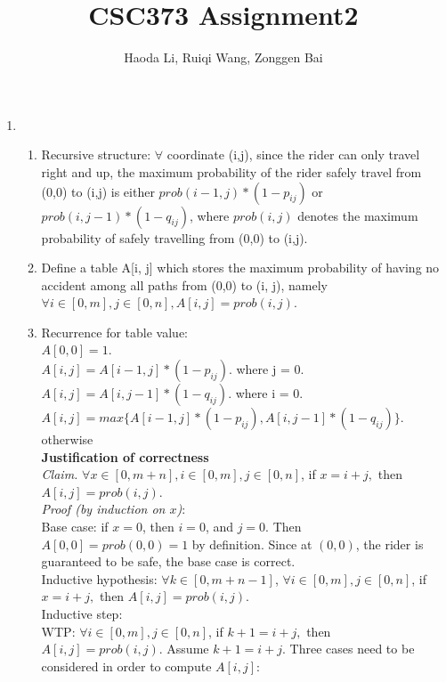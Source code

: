 \documentclass[11pt]{article}
\title{CSC373 Assignment2}
\author{Haoda Li, Ruiqi Wang, Zonggen Bai}
\begin{document}
\maketitle
\begin{enumerate}
    \item
    \begin{enumerate}
        \item Recursive structure: $\forall$ coordinate (i,j), since the rider can only travel right and up, the maximum probability of the rider safely travel from (0,0) to (i,j) is either $prob(i-1,j) * (1-p_{ij})$ or $prob(i,j-1) * (1-q_{ij})$, where $prob(i,j)$ denotes the maximum probability of safely travelling from (0,0) to (i,j).
        \item Define a table A[i, j] which stores the maximum probability of having no accident among all paths from (0,0) to (i, j), namely $\forall i \in [0,m], j \in [0,n], A[i,j]=prob(i,j)$.
        \item Recurrence for table value: \\
            $A[0, 0] = 1$. \\
            $A[i, j] = A[i-1, j] * (1- p_{ij})$. where j = 0.\\
            $A[i, j] =  A[i, j-1] * (1 - q_{ij})$. where i = 0.\\
            $A[i, j] = max\{ A[i-1, j] * (1- p_{ij}), A[i, j-1] * (1 - q_{ij})\}$. otherwise \\
            
            
            
        \textbf{Justification of correctness}\\
        
        \textit{Claim. }$\forall x \in [0,m+n], i \in [0,m], j \in [0,n]$, if $ x = i + j,$ then $A[i,j] = prob(i,j)$.\\
        
        \textit{Proof (by induction on $x$)}:\\
        Base case: if $x=0$, then $i=0$, and $j=0$. Then $A[0,0]=prob(0,0)=1$ by definition. Since at $(0,0)$, the rider is guaranteed to be safe, the base case is correct.\\
        Inductive hypothesis: $\forall k \in[0,m+n-1]$, $\forall i \in [0,m], j \in [0,n]$, if $ x = i + j,$ then $A[i,j] = prob(i,j)$. \\
        Inductive step: \\
        WTP: $\forall i \in [0,m], j \in [0,n]$, if $ k+1 = i + j,$ then $A[i,j] = prob(i,j)$. Assume $k+1=i+j$. Three cases need to be considered in order to compute $A[i,j]$:
        

\end{enumerate}
\end{enumerate}
\end{document}
